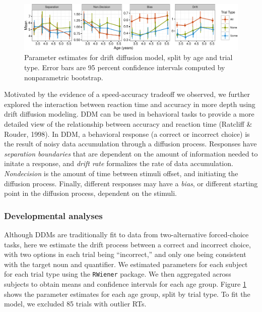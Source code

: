 \documentclass[10pt, letterpaper]{article}
\newenvironment{CodeChunk}{}{}
\begin{document}
\begin{CodeChunk}
\begin{figure}[t]

{\centering \includegraphics{figs/devo_param_plot-1} 

}

\caption[Parameter estimates for drift diffusion model, split by age and trial type]{Parameter estimates for drift diffusion model, split by age and trial type. Error bars are 95 percent confidence intervals computed by nonparametric bootstrap.}\label{fig:devo_param_plot}
\end{figure}
\end{CodeChunk}

Motivated by the evidence of a speed-accuracy tradeoff we observed, we
further explored the interaction between reaction time and accuracy in
more depth using drift diffusion modeling. DDM can be used in behavioral
tasks to provide a more detailed view of the relationship between
accuracy and reaction time (Ratcliff \& Rouder, 1998). In DDM, a
behavioral response (a correct or incorrect choice) is the result of
noisy data accumulation through a diffusion process. Responses have
\emph{separation boundaries} that are dependent on the amount of
information needed to initate a response, and \emph{drift rate}
formalizes the rate of data accumulation. \emph{Nondecision} is the
amount of time between stimuli offset, and initiating the diffusion
process. Finally, different responses may have a \emph{bias}, or
different starting point in the diffusion process, dependent on the
stimuli.

\subsubsection{Developmental analyses}\label{developmental-analyses}

Although DDMs are traditionally fit to data from two-alternative
forced-choice tasks, here we estimate the drift process between a
correct and incorrect choice, with two options in each trial being
``incorrect,'' and only one being consistent with the target noun and
quantifier. We estimated parameters for each subject for each trial type
using the \texttt{RWiener} package. We then aggregated across subjects
to obtain means and confidence intervals for each age group. Figure
\ref{fig:devo_param_plot} shows the parameter estimates for each age
group, split by trial type. To fit the model, we excluded 85 trials with
outlier RTs.
\end{document}
